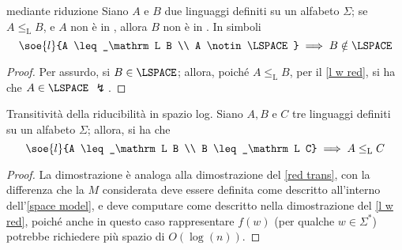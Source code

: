 \documentclass[a4paper, 12pt]{report}
\begin{document}
    \begin{framedcor}{\LSPACE mediante riduzione}
        Siano $A$ e $B$ due linguaggi definiti su un alfabeto $\Sigma$; se $A \leq_\mathrm L B$, e $A$ non è in \LSPACE, allora $B$ non è in \LSPACE. In simboli $$\soe{l}{A \leq_\mathrm L B \\ A \notin \LSPACE} \implies B \notin \LSPACE$$
    \end{framedcor}

    \begin{proof}
        Per assurdo, si $B \in \LSPACE$; allora, poiché $A \leq_\mathrm L B$, per il \cref{l w red}, si ha che $A \in \LSPACE$ $\lightning$.
    \end{proof}

    \begin{framedlem}[label={l red trans}]{Transitività della riducibilità in spazio log.}
        Siano $A, B$ e $C$ tre linguaggi definiti su un alfabeto $\Sigma$; allora, si ha che $$\soe{l}{A \leq_\mathrm L B \\ B \leq_\mathrm L C} \implies A \leq_\mathrm L C$$
    \end{framedlem}

    \begin{proof}
        La dimostrazione è analoga alla dimostrazione del \cref{red trans}, con la differenza che la \TM $M$ considerata deve essere definita come descritto all'interno dell'\cref{space model}, e deve computare come descritto nella dimostrazione del \cref{l w red}, poiché anche in questo caso rappresentare $f(w)$ (per qualche $w \in \Sigma^*$) potrebbe richiedere più spazio di $O(\log(n))$.
    \end{proof}
\end{document}
